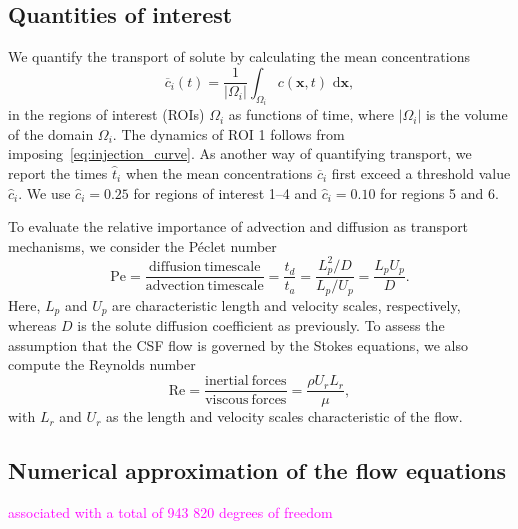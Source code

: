\documentclass[fleqn]{wlscirep}
\newcommand{\dx}{\, \mathrm d\bm{x}}
\newcommand{\xx}{\bm{x}}
\newcommand{\mer}[1]{\textcolor{magenta}{#1}}
\begin{document}
\subsection*{Quantities of interest}
We quantify the transport of solute by calculating the mean concentrations
\begin{equation}
    \overline{c}_i(t) = \frac{1}{|\Omega_i|}\int_{\Omega_i} c(\xx, t)\,\dx,
    \label{eq:c_mean_i}
\end{equation}
in the regions of interest (ROIs) $\Omega_i$ as functions of time, where $|\Omega_i|$ is the volume of the domain $\Omega_i$. The dynamics of ROI 1 follows from imposing~\cref{eq:injection_curve}. As another way of quantifying transport, we report the times $\hat{t}_i$ when the mean concentrations $\overline{c}_i$ first exceed a threshold value $\hat{c}_i$. We use $\hat{c}_i=0.25$ for regions of interest 1--4 and $\hat{c}_i=0.10$ for regions 5 and 6.

To evaluate the relative importance of advection and diffusion as transport mechanisms, we consider the Péclet number
\begin{equation*}
    \mathrm{Pe} = \frac{\mathrm{diffusion \ timescale}}{\mathrm{advection \ timescale}} = \frac{t_d}{t_a} = \frac{L_p^2/D}{L_p/U_p} = \frac{L_p U_p}{D}.
\end{equation*}
Here, $L_p$ and $U_p$ are characteristic length and velocity scales, respectively, whereas $D$ is the solute diffusion coefficient as previously. To assess the assumption that the CSF flow is governed by the Stokes equations, we also compute the Reynolds number
\begin{equation*}
    \mathrm{Re} = \frac{\mathrm{inertial \ forces}}{\mathrm{viscous \ forces}} = \frac{\rho U_r L_r}{\mu},
\end{equation*}
with $L_r$ and $U_r$ as the length and velocity scales characteristic of the flow. 

\subsection*{Numerical approximation of the flow equations}


\mer{associated with a total of 943 820 degrees of freedom}
\end{document}
